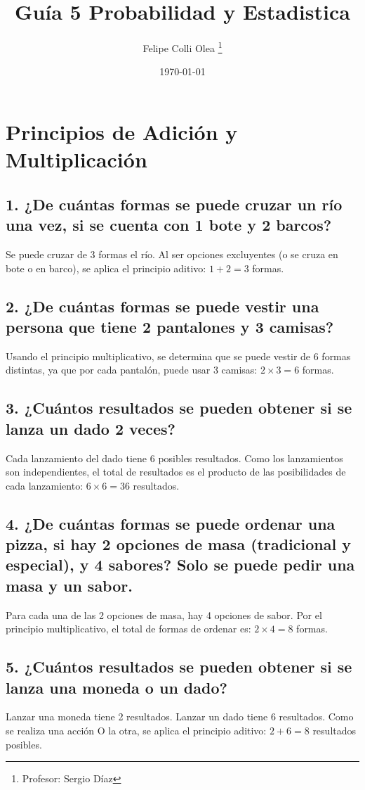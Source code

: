 \documentclass[11pt]{article}
\title{Guía 5 Probabilidad y Estadistica}
\author{Felipe Colli Olea \thanks{Profesor: Sergio Díaz}}
\date{\today}
\begin{document}
\maketitle
\tableofcontents
\newpage

\section{Principios de Adición y Multiplicación}
    \subsection*{1. ¿De cuántas formas se puede cruzar un río una vez, si se cuenta con 1 bote y 2 barcos?}
    Se puede cruzar de 3 formas el río. Al ser opciones excluyentes (o se cruza en bote o en barco), se aplica el principio aditivo: $1 + 2 = 3$ formas.

    \subsection*{2. ¿De cuántas formas se puede vestir una persona que tiene 2 pantalones y 3 camisas?}
    Usando el principio multiplicativo, se determina que se puede vestir de 6 formas distintas, ya que por cada pantalón, puede usar 3 camisas: $2 \times 3 = 6$ formas.

    \subsection*{3. ¿Cuántos resultados se pueden obtener si se lanza un dado 2 veces?}
    Cada lanzamiento del dado tiene 6 posibles resultados. Como los lanzamientos son independientes, el total de resultados es el producto de las posibilidades de cada lanzamiento: $6 \times 6 = 36$ resultados.

    \subsection*{4. ¿De cuántas formas se puede ordenar una pizza, si hay 2 opciones de masa (tradicional y especial), y 4 sabores? Solo se puede pedir una masa y un sabor.}
    Para cada una de las 2 opciones de masa, hay 4 opciones de sabor. Por el principio multiplicativo, el total de formas de ordenar es: $2 \times 4 = 8$ formas.

    \subsection*{5. ¿Cuántos resultados se pueden obtener si se lanza una moneda o un dado?}
    Lanzar una moneda tiene 2 resultados. Lanzar un dado tiene 6 resultados. Como se realiza una acción O la otra, se aplica el principio aditivo: $2 + 6 = 8$ resultados posibles.
\end{document}
